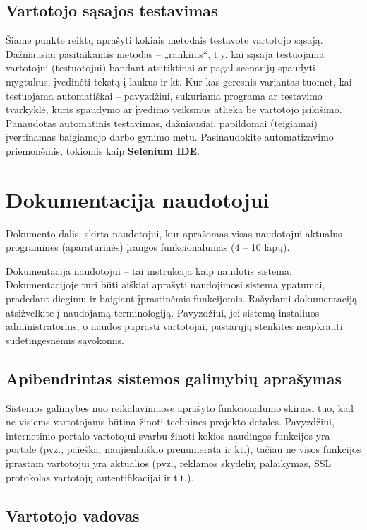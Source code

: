 \documentclass{ktuthesis}
\begin{document}
  \subsection{Vartotojo sąsajos testavimas}

  Šiame punkte reiktų aprašyti kokiais metodais testavote vartotojo sąsają. Dažniausiai pasitaikantis metodas – „rankinis“, t.y. kai sąsaja testuojama
  vartotojui (testuotojui) bandant atsitiktinai ar pagal scenarijų spaudyti mygtukus, įvedinėti tekstą į laukus ir kt. Kur kas geresnis variantas tuomet,
  kai testuojama automatiškai – pavyzdžiui, sukuriama programa ar testavimo tvarkyklė, kuris spaudymo ar įvedimo veiksmus atlieka be vartotojo įsikišimo.
  Panaudotas automatinis testavimas, dažniausiai, papildomai (teigiamai) įvertinamas baigiamojo darbo gynimo metu. Pasinaudokite automatizavimo priemonėmis,
  tokiomis kaip \textbf{Selenium IDE}.

  \section{Dokumentacija naudotojui}

  Dokumento dalis, skirta naudotojui, kur aprašomas visas naudotojui aktualus programinės (aparatūrinės) įrangos funkcionalumas (4 – 10 lapų).

  Dokumentacija naudotojui – tai instrukcija kaip naudotis sistema. Dokumentacijoje turi būti aiškiai aprašyti naudojimosi sistema ypatumai, pradedant
  diegimu ir baigiant įprastinėmis funkcijomis. Rašydami dokumentaciją atsižvelkite į naudojamą terminologiją. Pavyzdžiui, jei sistemą instaliuos administratorius,
  o naudos paprasti vartotojai, pastarųjų stenkitės neapkrauti sudėtingesnėmis sąvokomis.

  \subsection{Apibendrintas sistemos galimybių aprašymas}

  Sistemos galimybės nuo reikalavimuose aprašyto funkcionalumo skiriasi tuo, kad ne visiems vartotojams būtina žinoti technines projekto detales.
  Pavyzdžiui, internetinio portalo vartotojui svarbu žinoti kokios naudingos funkcijos yra portale (pvz., paieška, naujienlaiškio prenumerata ir kt.),
  tačiau ne visos funkcijos įprastam vartotojui yra aktualios (pvz., reklamos skydelių palaikymas, SSL protokolas vartotojų autentifikacijai ir t.t.).

  \subsection{Vartotojo vadovas}
\end{document}
